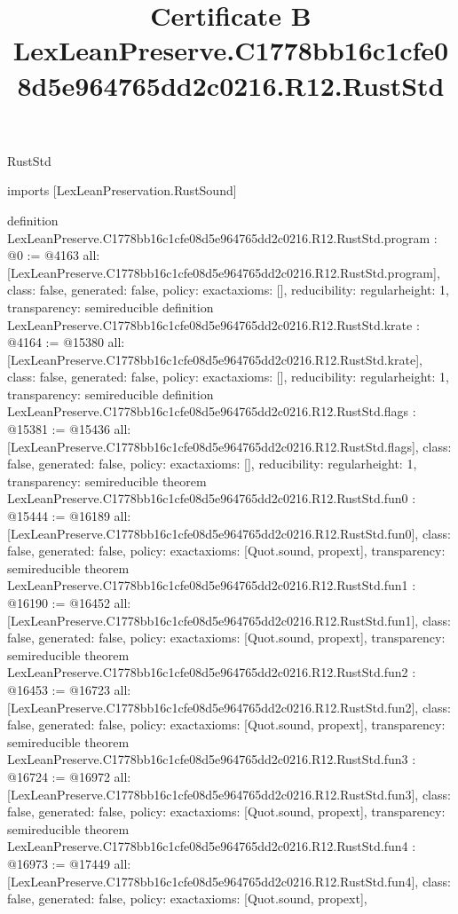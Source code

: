 \begin{lexlean}{RustStd}
\title{Certificate B LexLeanPreserve.C1778bb16c1cfe08d5e964765dd2c0216.R12.RustStd}
\begin{coremodule}
imports [LexLeanPreservation.RustSound]

definition LexLeanPreserve.C1778bb16c1cfe08d5e964765dd2c0216.R12.RustStd.program : @0 := @4163 {
  all: [LexLeanPreserve.C1778bb16c1cfe08d5e964765dd2c0216.R12.RustStd.program],
  class: false,
  generated: false,
  policy: exact{axioms: []},
  reducibility: regular{height: 1},
  transparency: semireducible
}
definition LexLeanPreserve.C1778bb16c1cfe08d5e964765dd2c0216.R12.RustStd.krate : @4164 := @15380 {
  all: [LexLeanPreserve.C1778bb16c1cfe08d5e964765dd2c0216.R12.RustStd.krate],
  class: false,
  generated: false,
  policy: exact{axioms: []},
  reducibility: regular{height: 1},
  transparency: semireducible
}
definition LexLeanPreserve.C1778bb16c1cfe08d5e964765dd2c0216.R12.RustStd.flags : @15381 := @15436 {
  all: [LexLeanPreserve.C1778bb16c1cfe08d5e964765dd2c0216.R12.RustStd.flags],
  class: false,
  generated: false,
  policy: exact{axioms: []},
  reducibility: regular{height: 1},
  transparency: semireducible
}
theorem LexLeanPreserve.C1778bb16c1cfe08d5e964765dd2c0216.R12.RustStd.fun0 : @15444 := @16189 {
  all: [LexLeanPreserve.C1778bb16c1cfe08d5e964765dd2c0216.R12.RustStd.fun0],
  class: false,
  generated: false,
  policy: exact{axioms: [Quot.sound, propext]},
  transparency: semireducible
}
theorem LexLeanPreserve.C1778bb16c1cfe08d5e964765dd2c0216.R12.RustStd.fun1 : @16190 := @16452 {
  all: [LexLeanPreserve.C1778bb16c1cfe08d5e964765dd2c0216.R12.RustStd.fun1],
  class: false,
  generated: false,
  policy: exact{axioms: [Quot.sound, propext]},
  transparency: semireducible
}
theorem LexLeanPreserve.C1778bb16c1cfe08d5e964765dd2c0216.R12.RustStd.fun2 : @16453 := @16723 {
  all: [LexLeanPreserve.C1778bb16c1cfe08d5e964765dd2c0216.R12.RustStd.fun2],
  class: false,
  generated: false,
  policy: exact{axioms: [Quot.sound, propext]},
  transparency: semireducible
}
theorem LexLeanPreserve.C1778bb16c1cfe08d5e964765dd2c0216.R12.RustStd.fun3 : @16724 := @16972 {
  all: [LexLeanPreserve.C1778bb16c1cfe08d5e964765dd2c0216.R12.RustStd.fun3],
  class: false,
  generated: false,
  policy: exact{axioms: [Quot.sound, propext]},
  transparency: semireducible
}
theorem LexLeanPreserve.C1778bb16c1cfe08d5e964765dd2c0216.R12.RustStd.fun4 : @16973 := @17449 {
  all: [LexLeanPreserve.C1778bb16c1cfe08d5e964765dd2c0216.R12.RustStd.fun4],
  class: false,
  generated: false,
  policy: exact{axioms: [Quot.sound, propext]},
}
\end{coremodule}
\end{lexlean}
